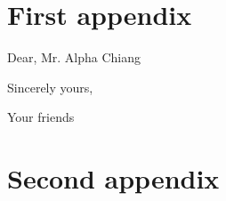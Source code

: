 \documentclass{mcmthesis}
\begin{document}
\begin{thebibliography}{99}
\end{thebibliography}

\begin{appendices}

\section{First appendix}


\begin{letter}{Dear, Mr. Alpha Chiang}

    \vspace{\parskip}

    Sincerely yours,

    Your friends

\end{letter}

\section{Second appendix}


\end{appendices}

\AImatter
\begin{ReportAiUse}{9}



\end{ReportAiUse}
\end{document}
